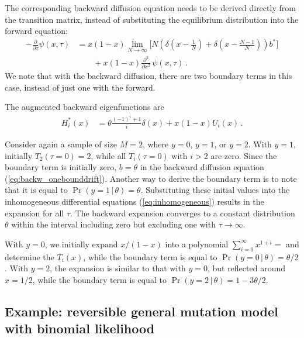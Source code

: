 \documentclass[preprint]{elsarticle}
\newcommand\given{{\,|\,}}
\begin{document}
The corresponding backward diffusion equation needs to be derived directly from the transition matrix, instead of substituting the equilibrium distribution into the forward equation:
\begin{equation}\label{eq:backw_onebounddrift}
\begin{split}
-\frac{\partial}{\partial \tau} \psi(x,\tau)&=
    x(1-x)\lim_{N\to\infty}\bigg[N\left(\delta(x-\tfrac1N)+\delta(x-\tfrac{N-1}N)\right)b^{*}\bigg]\\
    &\qquad+x(1-x)\frac{\partial^2}{\partial x^2}\,\psi(x,\tau)\,.
\end{split}
\end{equation}
We note that with the backward diffusion, there are two boundary terms in this case, instead of just one with the forward. 

The augmented backward eigenfunctions are
\begin{equation}\label{eq:backw_oneboundeigen}
\begin{split}
    H_i^{*}(x)&=\theta\tfrac{(-1)^i+1}{ i}\delta(x)+x(1-x)U_i(x)\,.
\end{split}
\end{equation}

Consider again a sample of size $M=2$, where $y=0$, $y=1$, or $y=2$. With $y=1$, initially $T_2(\tau=0)=2$, while all $T_i(\tau=0)$ with $i>2$ are zero. Since the boundary term is initially zero, $b=\theta$ in the backward diffusion equation (\ref{eq:backw_onebounddrift}). Another way to derive the boundary term is to note that it is equal to $\Pr(y=1\given \theta)=\theta$. Substituting these initial values into the inhomogeneous differential equations (\ref{eq:inhomogeneous}) results in the expansion for all $\tau$. The backward expansion converges to a constant distribution $\theta$ within the interval including zero but excluding one with $\tau\to\infty$.

With $y=0$, we initially expand $x/(1-x)$ into a polynomial $\sum_{i=0}^\infty x^{1+i}=$ and determine the $T_i(x)$, while the boundary term is equal to $\Pr(y=0\given \theta)=\theta/2$. With $y=2$, the expansion is similar to that with $y=0$, but reflected around $x=1/2$, while the boundary term is equal to $\Pr(y=2\given \theta)=1-3\theta/2$.

\subsection{Example: reversible general mutation model with binomial likelihood}
\end{document}

